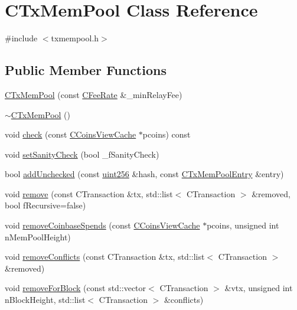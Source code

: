 \hypertarget{class_c_tx_mem_pool}{}\section{C\+Tx\+Mem\+Pool Class Reference}
\label{class_c_tx_mem_pool}


{\ttfamily \#include $<$txmempool.\+h$>$}

\subsection*{Public Member Functions}
\begin{DoxyCompactItemize}
\item 
\hyperlink{class_c_tx_mem_pool_a82147548cfa962975690d1926b717c1c}{C\+Tx\+Mem\+Pool} (const \hyperlink{class_c_fee_rate}{C\+Fee\+Rate} \&\+\_\+min\+Relay\+Fee)
\item 
\hyperlink{class_c_tx_mem_pool_a038108efea0c4312e5bed2ce064702b2}{$\sim$\+C\+Tx\+Mem\+Pool} ()
\item 
void \hyperlink{class_c_tx_mem_pool_ad74247cc4eb672fb9063d4e9503f4cf0}{check} (const \hyperlink{class_c_coins_view_cache}{C\+Coins\+View\+Cache} $\ast$pcoins) const 
\item 
void \hyperlink{class_c_tx_mem_pool_a1c0edb1fd5f0b02ddac46a6a97dcfd53}{set\+Sanity\+Check} (bool \+\_\+f\+Sanity\+Check)
\item 
bool \hyperlink{class_c_tx_mem_pool_a9e336997572ff8058d65afeb88ddde3b}{add\+Unchecked} (const \hyperlink{classuint256}{uint256} \&hash, const \hyperlink{class_c_tx_mem_pool_entry}{C\+Tx\+Mem\+Pool\+Entry} \&entry)
\item 
void \hyperlink{class_c_tx_mem_pool_a3a497097d9d5f325a2922a3970ac9da2}{remove} (const C\+Transaction \&tx, std\+::list$<$ C\+Transaction $>$ \&removed, bool f\+Recursive=false)
\item 
void \hyperlink{class_c_tx_mem_pool_a6d1292640d0b6028bd5c602a6a50a983}{remove\+Coinbase\+Spends} (const \hyperlink{class_c_coins_view_cache}{C\+Coins\+View\+Cache} $\ast$pcoins, unsigned int n\+Mem\+Pool\+Height)
\item 
void \hyperlink{class_c_tx_mem_pool_a11f1bddfbae7c03c6244db322876c0a7}{remove\+Conflicts} (const C\+Transaction \&tx, std\+::list$<$ C\+Transaction $>$ \&removed)
\item 
void \hyperlink{class_c_tx_mem_pool_ac97207311007676bd7ef056a625e0e0a}{remove\+For\+Block} (const std\+::vector$<$ C\+Transaction $>$ \&vtx, unsigned int n\+Block\+Height, std\+::list$<$ C\+Transaction $>$ \&conflicts)

\end{DoxyCompactItemize}
